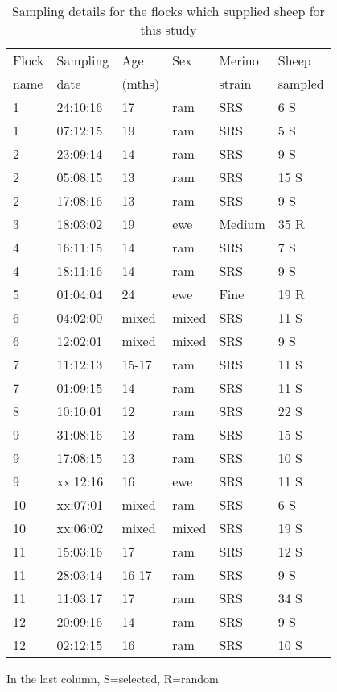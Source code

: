 %

\begin{table}[htp]
\centering
\caption{Sampling details for the flocks which supplied sheep for this study}
\label{tab:flocks}
\vspace{0.1in}
\begin{tabular}{|p{0.6in}|p{0.8in}|p{0.6in}|p{0.6in}|p{0.7in}|p{0.8in}|}  \hline
  Flock  & Sampling  & Age  & Sex & Merino  & Sheep   \\  
  name   & date      & (mths) &   & strain  & sampled\footnotemark \\ \hline
 1 & 24:10:16 & 17 & ram & SRS & 6 S \\
 1 & 07:12:15 & 19 & ram & SRS & 5 S \\
 2 & 23:09:14 & 14 & ram & SRS & 9 S \\
 2 & 05:08:15 & 13 & ram & SRS & 15 S \\
 2 & 17:08:16 & 13 & ram & SRS & 9 S \\
 3 & 18:03:02 & 19 & ewe & Medium  & 35 R \\
 4 & 16:11:15 & 14 & ram & SRS & 7 S \\
 4 & 18:11:16 & 14 & ram & SRS & 9 S \\
 5 & 01:04:04 & 24 & ewe & Fine & 19 R \\
 6 & 04:02:00 & mixed & mixed & SRS & 11 S \\
 6 & 12:02:01 & mixed & mixed & SRS & 9 S \\
 7 & 11:12:13 & 15-17 & ram & SRS & 11 S \\
 7 & 01:09:15 & 14 & ram & SRS & 11 S \\
 8 & 10:10:01 & 12 & ram & SRS & 22 S \\
 9 & 31:08:16 & 13 & ram & SRS & 15 S \\
 9 & 17:08:15 & 13 & ram & SRS & 10 S \\
 9 & xx:12:16 & 16 & ewe & SRS & 11 S \\
10 & xx:07:01 & mixed & ram & SRS & 6 S \\
10 & xx:06:02 & mixed & mixed & SRS & 19 S \\
11 & 15:03:16 & 17 & ram & SRS & 12 S \\
11 & 28:03:14 & 16-17 & ram & SRS & 9 S \\
11 & 11:03:17 & 17 & ram & SRS & 34 S \\
12 & 20:09:16 & 14 & ram & SRS & 9 S \\
12 & 02:12:15 & 16 & ram & SRS & 10 S \\ \hline
\end{tabular}
\begin{tablenotes}
\small
\item \footnotemark[1] In the last column, S=selected, R=random
\end{tablenotes}
\end{table}


%
